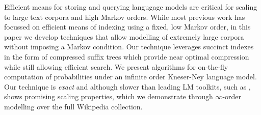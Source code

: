 Efficient means for storing and querying langugage models are critical for scaling  to large text corpora and high Markov orders.
While most previous work has focussed on efficient means of indexing \ngrams using a fixed, low Markov order,
in this paper we develop techniques that allow modelling of extremely large corpora without imposing a Markov condition.
Our technique leverages succinct indexes in the form of compressed suffix trees which provide near optimal compression while still allowing efficient search.
We present algorithms for on-the-fly computation of probabilities under an infinite order Kneser-Ney language model.
Our technique is \emph{exact} and although slower than leading LM toolkits, such as \SRILM, shows promising 
scaling properties, which we demonstrate through $\infty$-order modelling over the full Wikipedia collection. 

%
%
%
%
